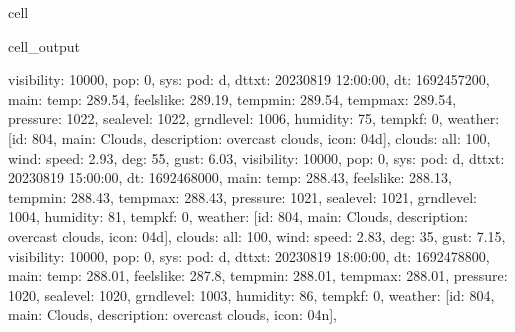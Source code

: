 \documentclass[letterpaper,10pt,english]{jupyterBook}
\begin{document}
\begin{sphinxuseclass}{cell}
\begin{sphinxVerbatimOutput}
\begin{sphinxuseclass}{cell_output}
\begin{sphinxVerbatim}[commandchars=\\\{\}]
\PYGZsq{}visibility\PYGZsq{}: 10000, \PYGZsq{}pop\PYGZsq{}: 0, \PYGZsq{}sys\PYGZsq{}: \PYGZob{}\PYGZsq{}pod\PYGZsq{}: \PYGZsq{}d\PYGZsq{}\PYGZcb{}, \PYGZsq{}dt\PYGZus{}txt\PYGZsq{}: \PYGZsq{}2023\PYGZhy{}08\PYGZhy{}19 12:00:00\PYGZsq{}\PYGZcb{}, \PYGZob{}\PYGZsq{}dt\PYGZsq{}: 1692457200, \PYGZsq{}main\PYGZsq{}: \PYGZob{}\PYGZsq{}temp\PYGZsq{}: 289.54, \PYGZsq{}feels\PYGZus{}like\PYGZsq{}: 289.19, \PYGZsq{}temp\PYGZus{}min\PYGZsq{}: 289.54, \PYGZsq{}temp\PYGZus{}max\PYGZsq{}: 289.54, \PYGZsq{}pressure\PYGZsq{}: 1022, \PYGZsq{}sea\PYGZus{}level\PYGZsq{}: 1022, \PYGZsq{}grnd\PYGZus{}level\PYGZsq{}: 1006, \PYGZsq{}humidity\PYGZsq{}: 75, \PYGZsq{}temp\PYGZus{}kf\PYGZsq{}: 0\PYGZcb{}, \PYGZsq{}weather\PYGZsq{}: [\PYGZob{}\PYGZsq{}id\PYGZsq{}: 804, \PYGZsq{}main\PYGZsq{}: \PYGZsq{}Clouds\PYGZsq{}, \PYGZsq{}description\PYGZsq{}: \PYGZsq{}overcast clouds\PYGZsq{}, \PYGZsq{}icon\PYGZsq{}: \PYGZsq{}04d\PYGZsq{}\PYGZcb{}], \PYGZsq{}clouds\PYGZsq{}: \PYGZob{}\PYGZsq{}all\PYGZsq{}: 100\PYGZcb{}, \PYGZsq{}wind\PYGZsq{}: \PYGZob{}\PYGZsq{}speed\PYGZsq{}: 2.93, \PYGZsq{}deg\PYGZsq{}: 55, \PYGZsq{}gust\PYGZsq{}: 6.03\PYGZcb{}, \PYGZsq{}visibility\PYGZsq{}: 10000, \PYGZsq{}pop\PYGZsq{}: 0, \PYGZsq{}sys\PYGZsq{}: \PYGZob{}\PYGZsq{}pod\PYGZsq{}: \PYGZsq{}d\PYGZsq{}\PYGZcb{}, \PYGZsq{}dt\PYGZus{}txt\PYGZsq{}: \PYGZsq{}2023\PYGZhy{}08\PYGZhy{}19 15:00:00\PYGZsq{}\PYGZcb{}, \PYGZob{}\PYGZsq{}dt\PYGZsq{}: 1692468000, \PYGZsq{}main\PYGZsq{}: \PYGZob{}\PYGZsq{}temp\PYGZsq{}: 288.43, \PYGZsq{}feels\PYGZus{}like\PYGZsq{}: 288.13, \PYGZsq{}temp\PYGZus{}min\PYGZsq{}: 288.43, \PYGZsq{}temp\PYGZus{}max\PYGZsq{}: 288.43, \PYGZsq{}pressure\PYGZsq{}: 1021, \PYGZsq{}sea\PYGZus{}level\PYGZsq{}: 1021, \PYGZsq{}grnd\PYGZus{}level\PYGZsq{}: 1004, \PYGZsq{}humidity\PYGZsq{}: 81, \PYGZsq{}temp\PYGZus{}kf\PYGZsq{}: 0\PYGZcb{}, \PYGZsq{}weather\PYGZsq{}: [\PYGZob{}\PYGZsq{}id\PYGZsq{}: 804, \PYGZsq{}main\PYGZsq{}: \PYGZsq{}Clouds\PYGZsq{}, \PYGZsq{}description\PYGZsq{}: \PYGZsq{}overcast clouds\PYGZsq{}, \PYGZsq{}icon\PYGZsq{}: \PYGZsq{}04d\PYGZsq{}\PYGZcb{}], \PYGZsq{}clouds\PYGZsq{}: \PYGZob{}\PYGZsq{}all\PYGZsq{}: 100\PYGZcb{}, \PYGZsq{}wind\PYGZsq{}: \PYGZob{}\PYGZsq{}speed\PYGZsq{}: 2.83, \PYGZsq{}deg\PYGZsq{}: 35, \PYGZsq{}gust\PYGZsq{}: 7.15\PYGZcb{}, \PYGZsq{}visibility\PYGZsq{}: 10000, \PYGZsq{}pop\PYGZsq{}: 0, \PYGZsq{}sys\PYGZsq{}: \PYGZob{}\PYGZsq{}pod\PYGZsq{}: \PYGZsq{}d\PYGZsq{}\PYGZcb{}, \PYGZsq{}dt\PYGZus{}txt\PYGZsq{}: \PYGZsq{}2023\PYGZhy{}08\PYGZhy{}19 18:00:00\PYGZsq{}\PYGZcb{}, \PYGZob{}\PYGZsq{}dt\PYGZsq{}: 1692478800, \PYGZsq{}main\PYGZsq{}: \PYGZob{}\PYGZsq{}temp\PYGZsq{}: 288.01, \PYGZsq{}feels\PYGZus{}like\PYGZsq{}: 287.8, \PYGZsq{}temp\PYGZus{}min\PYGZsq{}: 288.01, \PYGZsq{}temp\PYGZus{}max\PYGZsq{}: 288.01, \PYGZsq{}pressure\PYGZsq{}: 1020, \PYGZsq{}sea\PYGZus{}level\PYGZsq{}: 1020, \PYGZsq{}grnd\PYGZus{}level\PYGZsq{}: 1003, \PYGZsq{}humidity\PYGZsq{}: 86, \PYGZsq{}temp\PYGZus{}kf\PYGZsq{}: 0\PYGZcb{}, \PYGZsq{}weather\PYGZsq{}: [\PYGZob{}\PYGZsq{}id\PYGZsq{}: 804, \PYGZsq{}main\PYGZsq{}: \PYGZsq{}Clouds\PYGZsq{}, \PYGZsq{}description\PYGZsq{}: \PYGZsq{}overcast clouds\PYGZsq{}, \PYGZsq{}icon\PYGZsq{}: \PYGZsq{}04n\PYGZsq{}\PYGZcb{}], 
\end{sphinxVerbatim}
\end{sphinxuseclass}
\end{sphinxVerbatimOutput}
\end{sphinxuseclass}
\end{document}
